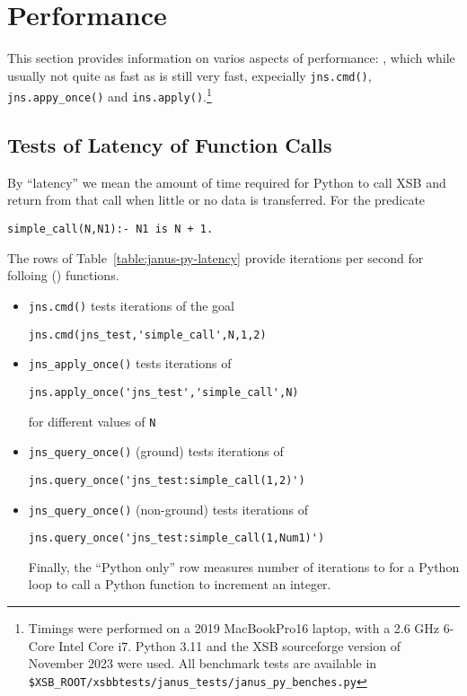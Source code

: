 \section{Performance} \label{sec:jns-perf}
%
This section provides information on varios aspects of \januspy{}
performance: \januspy , which while usually not quite as fast as
\janusplg{} is still very fast, expecially {\tt jns.cmd()}, {\tt
  jns.appy\_once()} and {\tt ins.apply()}.\footnote{Timings were
performed on a 2019 MacBookPro16 laptop, with a 2.6 GHz 6-Core Intel
Core i7.  Python 3.11 and the XSB sourceforge version of November 2023
were used.  All benchmark tests are available in {\tt
  \$XSB\_ROOT/xsbbtests/janus\_tests/janus\_py\_benches.py}}

\subsection{Tests of Latency of Function Calls}
By ``latency'' we mean the amount of time required for Python to call
XSB and return from that call when little or no data is transferred.
For the predicate
\begin{verbatim}
simple_call(N,N1):- N1 is N + 1.
\end{verbatim}
The rows of Table~\ref{table:janus-py-latency} provide iterations per
second for folloing \januspy() functions.
\begin{itemize}
\item {\tt jns.cmd()} tests iterations of the goal
\begin{verbatim}
jns.cmd(jns_test,'simple_call',N,1,2)
\end{verbatim}
\item {\tt jns\_apply\_once()} tests iterations of
\begin{verbatim}
jns.apply_once('jns_test','simple_call',N)
\end{verbatim}
for different values of {\tt N}
\item {\tt jns\_query\_once()} (ground) tests iterations of 
\begin{verbatim}
jns.query_once('jns_test:simple_call(1,2)')
\end{verbatim}
\item {\tt jns\_query\_once()} (non-ground) tests iterations of 
\begin{verbatim}
jns.query_once('jns_test:simple_call(1,Num1)')
\end{verbatim}
Finally, the ``Python only'' row measures number of iterations to for
a Python loop to call a Python function to increment an integer.
\end{itemize}

